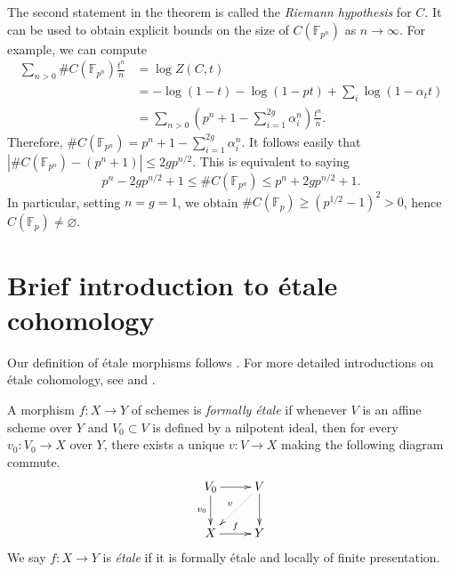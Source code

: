 \documentclass{article}
\begin{document}
The second statement in the theorem is called the \emph{Riemann hypothesis} 
for $C$. It can be used to obtain explicit bounds on the size of 
$C(\mathbb{F}_{p^n})$ as $n\to\infty$. For example, we can compute 
\begin{align*}
  \sum_{n>0} \# C(\mathbb{F}_{p^n}) \frac{t^n}{n} 
    &= \log Z(C,t) \\
    &= -\log(1-t) - \log(1-p t) + \sum_i \log(1-\alpha_t t) \\
    &= \sum_{n>0} \left(p^n+1-\sum_{i=1}^{2 g} \alpha_i^n\right) \frac{t^n}{n} \text{.}
\end{align*}
Therefore, $\# C(\mathbb{F}_{p^n}) = p^n+1-\sum_{i=1}^{2 g} \alpha_i^n$. It 
follows easily that $|\# C(\mathbb{F}_{p^n})-(p^n+1)| \leqslant 2 g p^{n/2}$. 
This is equivalent to saying 
\[
  p^n-2 g p^{n/2}+1 
    \leqslant \# C(\mathbb{F}_{p^n}) 
    \leqslant p^n + 2 g p^{n/2} + 1 \text{.}
\]
In particular, setting $n = g = 1$, we obtain 
$\# C(\mathbb{F}_p) \geqslant (p^{1/2}-1)^2>0$, hence 
$C(\mathbb{F}_p)\ne\varnothing$. 

























\appendix
\section{Brief introduction to \'etale cohomology}

Our definition of \'etale morphisms follows \cite[17.1]{ega4}. For more 
detailed introductions on \'etale cohomology, see \cite{mi-ec} and \cite{de77}. 





\begin{definition}
A morphism $f:X\to Y$ of schemes is \emph{formally \'etale} if whenever 
$V$ is an affine scheme over $Y$ and $V_0\subset V$ is defined by a nilpotent 
ideal, then for every $v_0:V_0 \to X$ over $Y$, there exists a unique 
$v:V\to X$ making the following diagram commute. 
\[\xymatrix{
  V_0 \ar[r] \ar[d]_-{v_0} 
    & V \ar[d] \ar@{.>}[dl]_-v \\
  X \ar[r]^-f 
    & Y
}\]
We say $f:X\to Y$ is \emph{\'etale} if it is formally \'etale and locally of 
finite presentation. 
\end{definition}
\end{document}
